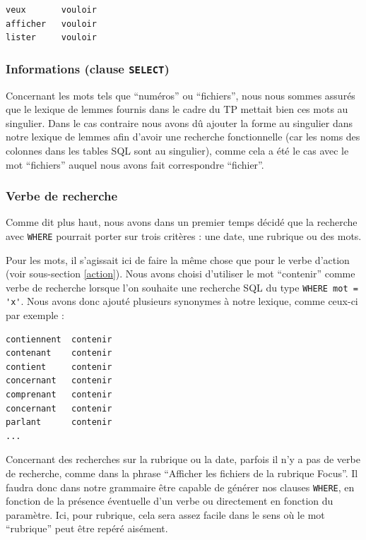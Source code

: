 \begin{lstlisting}
veux       vouloir
afficher   vouloir
lister     vouloir
\end{lstlisting}

\sql
\subsubsection{Informations (clause \lstinline{SELECT})}

Concernant les mots tels que ``numéros'' ou ``fichiers'', nous nous sommes assurés que le lexique de lemmes fournis dans le cadre du TP mettait bien ces mots au singulier. Dans le cas contraire nous avons dû ajouter la forme au singulier dans notre lexique de lemmes afin d'avoir une recherche fonctionnelle (car les noms des colonnes dans les tables SQL sont au singulier), comme cela a été le cas avec le mot ``fichiers'' auquel nous avons fait correspondre ``fichier''.

\subsubsection{Verbe de recherche}

Comme dit plus haut, nous avons dans un premier temps décidé que la recherche avec \sql\lstinline{WHERE} pourrait porter sur trois critères : une date, une rubrique ou des mots.

\medskip

Pour les mots, il s'agissait ici de faire la même chose que pour le verbe d'action (voir sous-section \ref{action}). Nous avons choisi d'utiliser le mot ``contenir'' comme verbe de recherche lorsque l'on souhaite une recherche SQL du type \lstinline{WHERE mot = 'x'}. Nous avons donc ajouté plusieurs synonymes à notre lexique, comme ceux-ci par exemple :

\begin{lstlisting}
contiennent  contenir
contenant    contenir
contient     contenir
concernant   contenir
comprenant   contenir
concernant   contenir
parlant      contenir
...
\end{lstlisting}

Concernant des recherches sur la rubrique ou la date, parfois il n'y a pas de verbe de recherche, comme dans la phrase ``Afficher les fichiers de la rubrique Focus''. Il faudra donc dans notre grammaire être capable de générer nos clauses \lstinline{WHERE}, en fonction de la présence éventuelle d'un verbe ou directement en fonction du paramètre. Ici, pour rubrique, cela sera assez facile dans le sens où le mot ``rubrique'' peut être repéré aisément.

